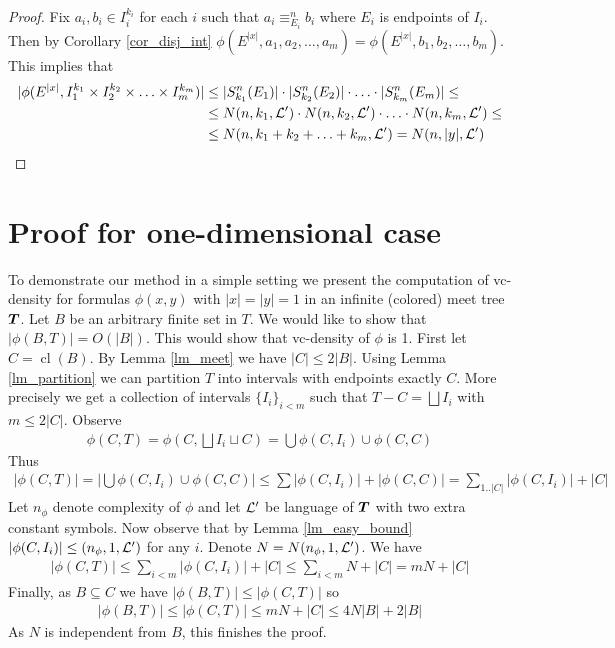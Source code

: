 \documentclass{amsart}
\DeclareMathOperator{\TT}{\boldface T}
\DeclareMathOperator{\cl}{cl}
\begin{document}
\begin{proof}
	Fix $a_i, b_i \in I_i^{k_i}$ for each $i$ such that $a_i \equiv^n_{E_i} b_i$ where $E_i$ is endpoints of $I_i$. Then by Corollary \ref{cor_disj_int} $\phi(E^{|x|}, a_1, a_2, \ldots, a_m) = \phi(E^{|x|}, b_1, b_2, \ldots, b_m)$. This implies that
	\begin{align*}
		|\phi(E^{|x|}, I_1^{k_1} \times I_2^{k_2} \times \ldots \times I_m^{k_m})|
		&\leq |S^n_{k_1}(E_1)| \cdot |S^n_{k_2}(E_2)| \cdot \ldots \cdot |S^n_{k_m}(E_m)| \leq \\
		&\leq N(n, k_1, \mathcal L') \cdot N(n, k_2, \mathcal L') \cdot \ldots \cdot N(n, k_m, \mathcal L')  \leq \\
		&\leq N(n, k_1 + k_2 + \ldots + k_m, \mathcal L') = N(n, |y|, \mathcal L')
	\end{align*}
\end{proof}

\section{Proof for one-dimensional case}

To demonstrate our method in a simple setting we present the computation of vc-density for formulas $\phi(x, y)$ with $|x| = |y| = 1$ in an infinite (colored) meet tree $\TT$. Let $B$ be an arbitrary finite set in $T$. We would like to show that $|\phi(B, T)| = O(|B|)$. This would show that vc-density of $\phi$ is 1. First let $C = \cl(B)$. By Lemma \ref{lm_meet} we have $|C| \leq 2|B|$. Using Lemma \ref{lm_partition} we can partition $T$ into intervals with endpoints exactly $C$. More precisely we get a collection of intervals $\{I_i\}_{i < m}$ such that $T - C = \bigsqcup I_i$ with $m \leq 2|C|$. Observe
\begin{align*}
	\phi(C,T) = \phi(C, \bigsqcup I_i \sqcup C) = \bigcup \phi(C, I_i) \cup \phi(C, C)
\end{align*}
Thus
\begin{align*}
 |\phi(C,T)| = \left|\bigcup \phi(C, I_i) \cup \phi(C, C)\right| \leq \sum |\phi(C, I_i)| + |\phi(C, C)| = \sum_{1..|C|} |\phi(C, I_i)| + |C|
\end{align*}
Let $n_\phi$ denote complexity of $\phi$ and let $\mathcal L'$ be language of $\TT$ with two extra constant symbols. Now observe that by Lemma \ref{lm_easy_bound} $|\phi(C, I_i)| \leq (n_\phi, 1, \mathcal L')$ for any $i$. Denote $N = N(n_\phi, 1, \mathcal L')$. We have
\begin{align*}
	|\phi(C,T)| \leq \sum_{i < m} |\phi(C, I_i)| + |C| \leq \sum_{i < m} N + |C| = mN + |C|
\end{align*}
Finally, as $B \subseteq C$ we have $|\phi(B,T)| \leq |\phi(C,T)|$ so
\begin{align*}
	|\phi(B,T)| \leq |\phi(C,T)| \leq mN + |C| \leq 4N|B| + 2|B|
\end{align*}
As $N$ is independent from $B$, this finishes the proof.
\end{document}
